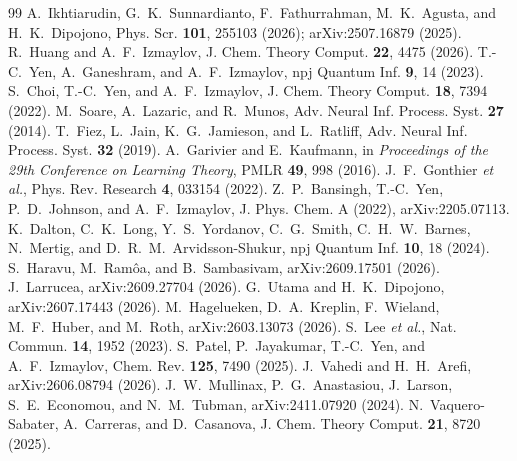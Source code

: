 \documentclass[aps,pra,reprint,superscriptaddress,nofootinbib]{revtex4-2}
\begin{document}
\begin{thebibliography}{99}
 A.~Ikhtiarudin, G.~K.~Sunnardianto, F.~Fathurrahman, M.~K.~Agusta, and H.~K.~Dipojono, Phys. Scr. \textbf{101}, 255103 (2026); arXiv:2507.16879 (2025).
 R.~Huang and A.~F.~Izmaylov, J. Chem. Theory Comput. \textbf{22}, 4475 (2026).
 T.-C.~Yen, A.~Ganeshram, and A.~F.~Izmaylov, npj Quantum Inf. \textbf{9}, 14 (2023).
 S.~Choi, T.-C.~Yen, and A.~F.~Izmaylov, J. Chem. Theory Comput. \textbf{18}, 7394 (2022).
 M.~Soare, A.~Lazaric, and R.~Munos, Adv. Neural Inf. Process. Syst. \textbf{27} (2014).
 T.~Fiez, L.~Jain, K.~G.~Jamieson, and L.~Ratliff, Adv. Neural Inf. Process. Syst. \textbf{32} (2019).
 A.~Garivier and E.~Kaufmann, in \textit{Proceedings of the 29th Conference on Learning Theory}, PMLR \textbf{49}, 998 (2016).
 J.~F.~Gonthier \textit{et al.}, Phys. Rev. Research \textbf{4}, 033154 (2022).
 Z.~P.~Bansingh, T.-C.~Yen, P.~D.~Johnson, and A.~F.~Izmaylov, J. Phys. Chem. A (2022), arXiv:2205.07113.
 K.~Dalton, C.~K.~Long, Y.~S.~Yordanov, C.~G.~Smith, C.~H.~W.~Barnes, N.~Mertig, and D.~R.~M.~Arvidsson-Shukur, npj Quantum Inf. \textbf{10}, 18 (2024).
 S.~Haravu, M.~Ram\^oa, and B.~Sambasivam, arXiv:2609.17501 (2026).
 J.~Larrucea, arXiv:2609.27704 (2026).
 G.~Utama and H.~K.~Dipojono, arXiv:2607.17443 (2026).
 M.~Hagelueken, D.~A.~Kreplin, F.~Wieland, M.~F.~Huber, and M.~Roth, arXiv:2603.13073 (2026).
 S.~Lee \textit{et al.}, Nat. Commun. \textbf{14}, 1952 (2023).
 S.~Patel, P.~Jayakumar, T.-C.~Yen, and A.~F.~Izmaylov, Chem. Rev. \textbf{125}, 7490 (2025).
 J.~Vahedi and H.~H.~Arefi, arXiv:2606.08794 (2026).
 J.~W.~Mullinax, P.~G.~Anastasiou, J.~Larson, S.~E.~Economou, and N.~M.~Tubman, arXiv:2411.07920 (2024).
 N.~Vaquero-Sabater, A.~Carreras, and D.~Casanova, J. Chem. Theory Comput. \textbf{21}, 8720 (2025).
\end{thebibliography}
\end{document}
